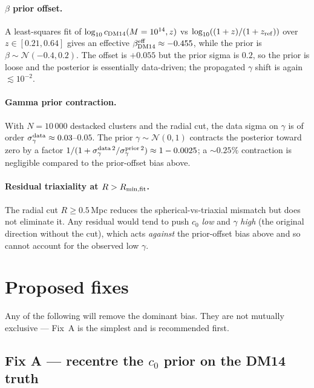 \documentclass[11pt,a4paper]{article}
\newcommand{\zref}{z_{\rm ref}}
\newcommand{\Rmin}{R_{\rm min,fit}}
\begin{document}
\paragraph{$\beta$ prior offset.}
A least-squares fit of $\log_{10}c_{\rm DM14}(M=10^{14}, z)$ vs
$\log_{10}((1+z)/(1+\zref))$ over $z\in[0.21, 0.64]$ gives an effective
$\beta_{\rm DM14}^{\rm eff} \approx -0.455$, while the prior is
$\beta \sim \mathcal{N}(-0.4, 0.2)$.  The offset is $+0.055$ but the prior
sigma is $0.2$, so the prior is loose and the posterior is essentially
data-driven; the propagated $\gamma$ shift is again $\lesssim 10^{-2}$.

\paragraph{Gamma prior contraction.}
With $N=10\,000$ destacked clusters and the radial cut, the data sigma on
$\gamma$ is of order $\sigma_\gamma^{\rm data} \approx 0.03$--$0.05$.  The
prior $\gamma \sim \mathcal{N}(0, 1)$ contracts the posterior toward zero by a
factor $1/(1 + \sigma_\gamma^{\rm data\,2}/\sigma_\gamma^{\rm prior\,2})
\approx 1 - 0.0025$; a $\sim 0.25\%$ contraction is negligible compared to
the prior-offset bias above.

\paragraph{Residual triaxiality at $R > \Rmin$.}
The radial cut $R \ge 0.5$\,Mpc reduces the spherical-vs-triaxial mismatch but
does not eliminate it.  Any residual would tend to push $c_0$ \emph{low} and
$\gamma$ \emph{high} (the original direction without the cut), which acts
\emph{against} the prior-offset bias above and so cannot account for the
observed low $\gamma$.

\section{Proposed fixes}
\label{sec:fixes}

Any of the following will remove the dominant bias.  They are not mutually
exclusive — Fix~A is the simplest and is recommended first.

\subsection*{Fix A — recentre the $c_0$ prior on the DM14 truth}
\end{document}
